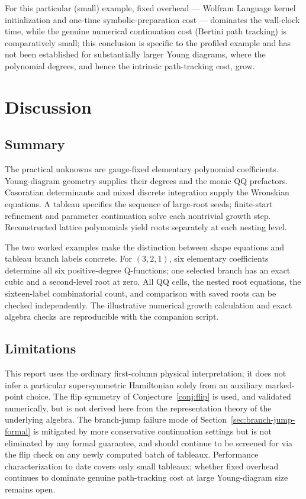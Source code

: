 \documentclass[11pt]{article}
\begin{document}
For this particular (small) example, fixed overhead --- Wolfram Language
kernel initialization and one-time symbolic-preparation cost --- dominates
the wall-clock time, while the genuine numerical continuation cost
(Bertini path tracking) is comparatively small; this conclusion is
specific to the profiled example and has not been established for
substantially larger Young diagrams, where the polynomial degrees, and
hence the intrinsic path-tracking cost, grow.


\section{Discussion}
\label{sec:discussion}

\subsection{Summary}

The practical unknowns are gauge-fixed elementary polynomial
coefficients. Young-diagram geometry supplies their degrees and the
monic QQ prefactors. Casoratian determinants and mixed discrete
integration supply the Wronskian equations. A tableau specifies the
sequence of large-root seeds; finite-start refinement and parameter
continuation solve each nontrivial growth step. Reconstructed lattice
polynomials yield roots separately at each nesting level.

The two worked examples make the distinction between shape equations
and tableau branch labels concrete. For $(3,2,1)$, six elementary
coefficients determine all six positive-degree Q-functions; one
selected branch has an exact cubic and a second-level root at zero.
All QQ cells, the nested root equations, the sixteen-label combinatorial
count, and comparison with saved roots can be checked independently.
The illustrative numerical growth calculation and exact algebra checks
are reproducible with the companion script.

\subsection{Limitations}

This report uses the ordinary first-column physical interpretation;
it does not infer a particular supersymmetric Hamiltonian solely from
an auxiliary marked-point choice.
The flip symmetry of Conjecture~\ref{conj:flip} is used, and validated
numerically, but is not derived here from the representation theory of
the underlying algebra. The branch-jump failure mode of
Section~\ref{sec:branch-jump-formal} is mitigated by more conservative
continuation settings but is not eliminated by any formal guarantee, and
should continue to be screened for via the flip check on any newly
computed batch of tableaux. Performance characterization to date covers
only small tableaux; whether fixed overhead continues to dominate genuine
path-tracking cost at large Young-diagram size remains open.
\end{document}
